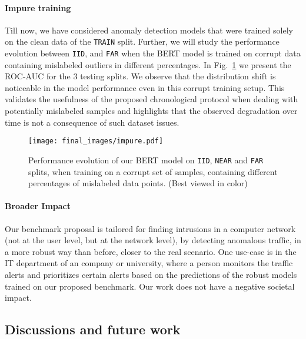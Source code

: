 \documentclass{article}
\begin{document}
        
\paragraph{Impure training} Till now, we have considered anomaly detection models that were trained solely on the clean data of the \texttt{TRAIN} split. Further, we will study the performance evolution between \texttt{IID},  and \texttt{FAR} when the BERT model is trained on corrupt data containing mislabeled outliers in different percentages. In Fig.~\ref{fig:impure} we present the ROC-AUC for the 3 testing splits. We observe that the distribution shift is noticeable in the model performance even in this corrupt training setup. This validates the usefulness of the proposed chronological protocol when dealing with potentially mislabeled samples and highlights that the observed degradation over time is not a consequence of such dataset issues.



\begin{figure}[t]
    \begin{center}
        \texttt{[image: final\_images/impure.pdf]}
    \end{center}
    \caption{Performance evolution of our BERT model on \texttt{IID}, \texttt{NEAR} and \texttt{FAR} splits, when training on a corrupt set of samples, containing different percentages of mislabeled data points. (Best viewed in color)}
    \label{fig:impure}
\end{figure}





\paragraph{Broader Impact} Our benchmark proposal is tailored for finding intrusions in a computer network (not at the user level, but at the network level), by detecting anomalous traffic, in a more robust way than before, closer to the real scenario. One use-case is in the IT department of an company or university, where a person monitors the traffic alerts and prioritizes certain alerts based on the predictions of the robust models trained on our proposed benchmark. Our work does not have a negative societal impact.



\subsection{Discussions and future work}
\label{appendix:discussions}
\end{document}
